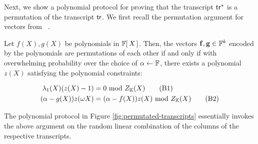 Next, we show a polynomial protocol for proving that the transcript $\mathsf{tr}^\ast$ is a permutation of the transcript $\mathsf{tr}$.
We first recall the permutation argument for vectors from ~\cite{EPRINT:GabWilCio19}.
\begin{lemma}\label{lem:perm-argument}
Let $f(X), g(X)$ be polynomials in $\mathbb{F}[\,X\,]$. Then, the vectors $\mathbf{f}, \mathbf{g}\in \mathbb{F}^k$ encoded by the polynomials
are permutations of each other if and only if with overwhelming probability over the choice of $\alpha\gets \mathbb{F}$,
there exists a polynomial $z(X)$ satisfying the polynomial constraints:

\begin{align}
    \lambda_1(X)(z(X) -1) &= 0 \text{ mod } Z_{\mathbb{K}}(X) \tag{B1} \label{eq:B1} \\
    (\alpha - g(X))z(\omega X) &= (\alpha - f(X))z(X) \text{ mod } Z_{\mathbb{K}}(X) \tag{B2} \label{eq:B2}
\end{align}

\end{lemma}
The polynomial protocol in Figure \ref{fig:permutated-transcripts} essentially invokes the above argument on
the random linear combination of the columns of the respective transcripts.
